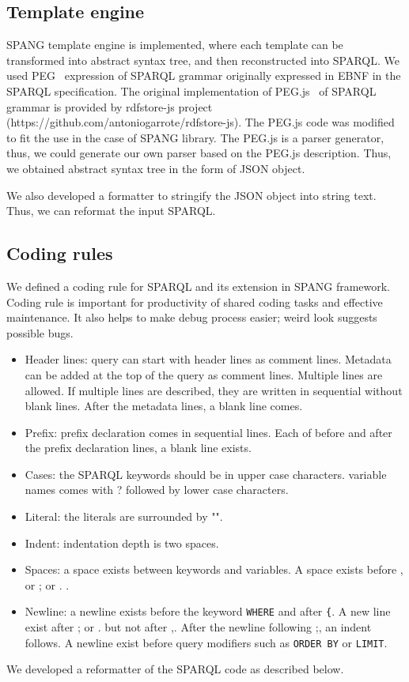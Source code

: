 \documentclass[runningheads]{llncs}
\begin{document}
\subsection{Template engine}
SPANG template engine is implemented, where each template can be transformed into abstract syntax tree, and then reconstructed into SPARQL. 
We used PEG~\cite{peg} expression of SPARQL grammar originally expressed in EBNF in the SPARQL specification. The original implementation of PEG.js~\cite{pegjs} of SPARQL grammar is provided by rdfstore-js project (https://github.com/antoniogarrote/rdfstore-js).
The PEG.js code was modified to fit the use in the case of SPANG library.
The PEG.js is a parser generator, thus, we could generate our own parser based on the PEG.js description. Thus, we obtained abstract syntax tree in the form of JSON object.

We also developed a formatter to stringify the JSON object into string text. Thus, we can reformat the input SPARQL.


\subsection{Coding rules}
We defined a coding rule for SPARQL and its extension in SPANG framework. Coding rule is important for productivity of shared coding tasks and effective maintenance. It also helps to make debug process easier; weird look suggests possible bugs. 
\begin{itemize}
    \item Header lines: query can start with header lines as comment lines. Metadata can be added at the top of the query as comment lines. Multiple lines are allowed. If multiple lines are described, they are written in sequential without blank lines. After the metadata lines, a blank line comes.
    \item Prefix: prefix declaration comes in sequential lines. Each of before and after the prefix declaration lines, a blank line exists.
    \item Cases: the SPARQL keywords should be in upper case characters. variable names comes with ? followed by lower case characters.
    \item Literal: the literals are surrounded by "".
    \item Indent: indentation depth is two spaces.
    \item Spaces: a space exists between keywords and variables. A space exists before , or ; or . .
    \item Newline: a newline exists before the keyword \texttt{WHERE} and after \texttt{\{}. A new line exist after ; or . but not after ,. After the newline following ;, an indent follows. A newline exist before query modifiers such as \texttt{ORDER BY} or \texttt{LIMIT}.
\end{itemize}
We developed a reformatter of the SPARQL code as described below.
\end{document}
